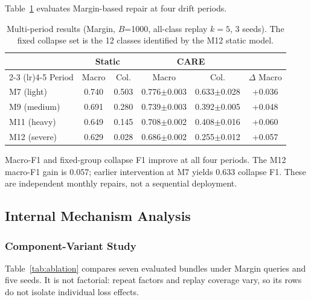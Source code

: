 \documentclass[journal]{IEEEtran}
\newcommand{\ours}{CARE}  %
\begin{document}
Table~\ref{tab:multiperiod} evaluates Margin-based repair at four drift periods.

\begin{table}[!htbp]
\centering
\caption{Multi-period results (Margin, $B$=1000, all-class replay $k{=}5$, 3 seeds). The fixed collapse set is the 12 classes identified by the M12 static model.}
\label{tab:multiperiod}
\scriptsize
\setlength{\tabcolsep}{3pt}
\begin{tabular}{@{}l cc cc c@{}}
\toprule
& \multicolumn{2}{c}{Static} & \multicolumn{2}{c}{\ours{}} & \\
\cmidrule(lr){2-3} \cmidrule(lr){4-5}
Period & Macro & Col. & Macro & Col. & $\Delta$ Macro \\
\midrule
M7 (light)   & 0.740 & 0.503 & 0.776$\pm$0.003 & 0.633$\pm$0.028 & +0.036 \\
M9 (medium)  & 0.691 & 0.280 & 0.739$\pm$0.003 & 0.392$\pm$0.005 & +0.048 \\
M11 (heavy)  & 0.649 & 0.145 & 0.708$\pm$0.002 & 0.408$\pm$0.016 & +0.060 \\
M12 (severe) & 0.629 & 0.028 & 0.686$\pm$0.002 & 0.255$\pm$0.012 & +0.057 \\
\bottomrule
\end{tabular}
\end{table}


Macro-F1 and fixed-group collapse F1 improve at all four periods. The M12 macro-F1 gain is 0.057; earlier intervention at M7 yields 0.633 collapse F1. These are independent monthly repairs, not a sequential deployment.

\subsection{Internal Mechanism Analysis}
\label{sec:mechanism_analysis}


\subsubsection{Component-Variant Study}
\label{sec:ablation}
Table~\ref{tab:ablation} compares seven evaluated bundles under Margin queries and five seeds. It is not factorial: repeat factors and replay coverage vary, so its rows do not isolate individual loss effects.
\end{document}
